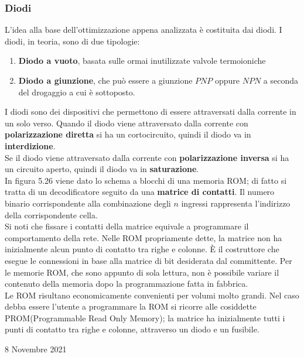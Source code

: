 \documentclass[a4paper]{extarticle}
\begin{document}
\subsubsection{Diodi}
L'idea alla base dell'ottimizzazione appena analizzata è costituita dai diodi. I diodi, in teoria, sono di due tipologie:
\begin{enumerate}
    \item \textbf{Diodo a vuoto}, basata sulle ormai inutilizzate valvole termoioniche
    \item \textbf{Diodo a giunzione}, che può essere a giunzione \(PNP\) oppure \(NPN\) a seconda del drogaggio a cui è sottoposto.
\end{enumerate}

\vspace{1em}
\noindent
I diodi sono dei dispositivi che permettono di essere attraversati dalla corrente in un solo verso. Quando il diodo viene attraversato dalla corrente con \textbf{polarizzazione diretta} si ha un cortocircuito, quindi il diodo va in \textbf{interdizione}.\\
Se il diodo viene attraversato dalla corrente con \textbf{polarizzazione inversa} si ha un circuito aperto, quindi il diodo va in \textbf{saturazione}.\\
In figura 5.26 viene dato lo schema a blocchi di una memoria ROM; di fatto si tratta di un decodificatore seguito da una \textbf{matrice di contatti}. Il numero binario corrispondente alla combinazione degli \(n\) ingressi rappresenta l’indirizzo della corrispondente cella.\\
Si noti che fissare i contatti della matrice equivale a programmare il comportamento della rete. Nelle ROM propriamente dette, la matrice non ha inizialmente alcun punto di contatto tra righe e colonne. È il costruttore che esegue le connessioni in base alla matrice di bit desiderata dal committente. Per le memorie ROM, che sono appunto di sola lettura, non è possibile variare il contenuto della memoria dopo la programmazione fatta in fabbrica.\\
Le ROM risultano economicamente convenienti per volumi molto grandi.
Nel caso debba essere l’utente a programmare la ROM si ricorre alle cosiddette PROM(Programmable Read Only
Memory); la matrice ha inizialmente tutti i punti di contatto tra righe e colonne, attraverso un diodo e un fusibile.

\newpage
\begin{center}
    8 Novembre 2021
\end{center}
\end{document}
